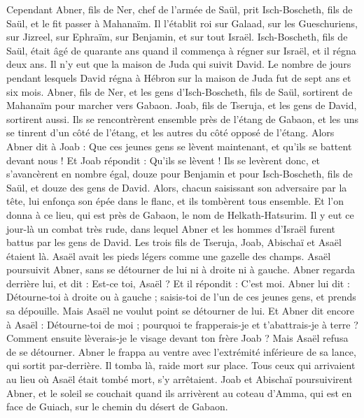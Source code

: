 \begin{multicols}{2}
Cependant Abner, fils de Ner, chef de l'armée de Saül, prit Isch-Boscheth, fils de Saül, et le fit passer à Mahanaïm.
Il l'établit roi sur Galaad, sur les Gueschuriens, sur Jizreel, sur Ephraïm, sur Benjamin, et sur tout Israël.
Isch-Boscheth, fils de Saül, était âgé de quarante ans quand il commença à régner sur Israël, et il régna deux ans. Il n'y eut que la maison de Juda qui suivit David.
Le nombre de jours pendant lesquels David régna à Hébron sur la maison de Juda fut de sept ans et six mois.
Abner, fils de Ner, et les gens d'Isch-Boscheth, fils de Saül, sortirent de Mahanaïm pour marcher vers Gabaon.
Joab, fils de Tseruja, et les gens de David, sortirent aussi. Ils se rencontrèrent ensemble près de l'étang de Gabaon, et les uns se tinrent d'un côté de l'étang, et les autres du côté opposé de l'étang.
Alors Abner dit à Joab : Que ces jeunes gens se lèvent maintenant, et qu'ils se battent devant nous ! Et Joab répondit : Qu'ils se lèvent !
Ils se levèrent donc, et s'avancèrent en nombre égal, douze pour Benjamin et pour Isch-Boscheth, fils de Saül, et douze des gens de David.
Alors, chacun saisissant son adversaire par la tête, lui enfonça son épée dans le flanc, et ils tombèrent tous ensemble. Et l'on donna à ce lieu, qui est près de Gabaon, le nom de Helkath-Hatsurim.
Il y eut ce jour-là un combat très rude, dans lequel Abner et les hommes d'Israël furent battus par les gens de David.
Les trois fils de Tseruja, Joab, Abischaï et Asaël étaient là. Asaël avait les pieds légers comme une gazelle des champs.
Asaël poursuivit Abner, sans se détourner de lui ni à droite ni à gauche.
Abner regarda derrière lui, et dit : Est-ce toi, Asaël ? Et il répondit : C'est moi.
Abner lui dit : Détourne-toi à droite ou à gauche ; saisis-toi de l'un de ces jeunes gens, et prends sa dépouille. Mais Asaël ne voulut point se détourner de lui.
Et Abner dit encore à Asaël : Détourne-toi de moi ; pourquoi te frapperais-je et t'abattrais-je à terre ? Comment ensuite lèverais-je le visage devant ton frère Joab ?
Mais Asaël refusa de se détourner. Abner le frappa au ventre avec l'extrémité inférieure de sa lance, qui sortit par-derrière. Il tomba là, raide mort sur place. Tous ceux qui arrivaient au lieu où Asaël était tombé mort, s'y arrêtaient.
Joab et Abischaï poursuivirent Abner, et le soleil se couchait quand ils arrivèrent au coteau d'Amma, qui est en face de Guiach, sur le chemin du désert de Gabaon.

\end{multicols}
